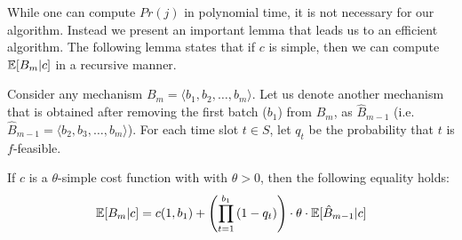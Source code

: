 While one can compute $Pr(j)$ in polynomial time, it is not necessary for our algorithm. Instead we present an important lemma that leads us to an efficient algorithm. The following lemma states that if $c$ is simple, then we can compute $\mathbb{E}[B_{m}|c]$ in a recursive manner.

\begin{lemma} \label{bdoodle:lemma:recurrence} 
	Consider any mechanism $B_m = \langle b_1, b_2, \dots, b_m \rangle$. Let us denote another mechanism that is obtained after removing the first batch ($b_1$) from $B_m$, as $\hat{B}_{m-1}$ (i.e. $\hat{B}_{m-1} = \langle b_2, b_3, \dots, b_m \rangle$). For each time slot $t \in S$, let $q_t$ be the probability that $t$ is $f$-feasible.

If $c$ is a $\theta$-simple cost function with with $\theta > 0$, then the following equality holds:
\begin{equation} \label{bdoodle:eqn:recurrence}
\mathbb{E}[B_{m}|c] = c(1, b_1) +  \left(\prod_{t=1}^{b_1} \left(1 - q_t\right)\right) \cdot \theta \cdot \mathbb{E}[\hat{B}_{m-1}|c]
\end{equation}
\end{lemma}
